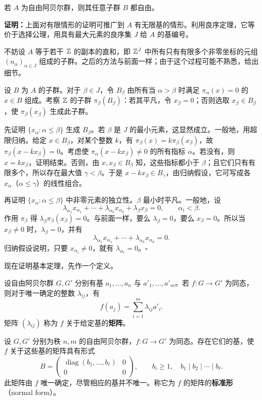 若 $A$ 为自由阿贝尔群，则其任意子群 $B$ 都自由。

\noindent\textbf{证明：}上面对有限情形的证明可推广到 $A$ 有无限基的情形。利用良序定理，它等价于选择公理，用具有最大元素的良序集 $J$ 给 $A$ 的基编号。

不妨设 $A$ 等于若干 $\mathbb{Z}$ 的副本的直和，即 $\mathbb{Z}^J$ 中所有只有有限多个非零坐标的元组 $(n_\alpha)_{\alpha\in J}$ 组成的子群。之后的方法与前面一样；由于这个过程可能不熟悉，给出细节。

设 $B$ 为 $A$ 的子群。对于 $\beta\in J$，令 $B_\beta$ 由所有当 $\alpha>\beta$ 时满足 $\pi_\alpha(x)=0$ 的 $x\in B$ 组成。考察 $\mathbb{Z}$ 的子群 $\pi_\beta(B_\beta)$：若其平凡，令 $x_\beta=0$；否则选取 $x_\beta\in B_\beta$，使 $\pi_\beta(x_\beta)$ 生成此子群。

先证明 $\{x_\alpha:\alpha\leq\beta\}$ 生成 $B_\beta$。若 $\beta$ 是 $J$ 的最小元素，这显然成立。一般地，用超限归纳。给定 $x\in B_\beta$，对某个整数 $k$，有 $\pi_\beta(x)=k\pi_\beta(x_\beta)$，故 $\pi_\beta(x-kx_\beta)=0$。考虑使 $\pi_\alpha(x-kx_\beta)\ne0$ 的所有指标 $\alpha$。若没有，则 $x=kx_\beta$，证明结束。否则，由 $x,x_\beta\in B_\beta$ 知，这些指标都小于 $\beta$；且它们只有有限多个，所以存在最大值 $\gamma<\beta$。于是 $x-kx_\beta\in B_\gamma$，由归纳假设，它可写成各 $x_\alpha$（$\alpha\leq\gamma$）的线性组合。

再证明 $\{x_\alpha:\alpha\leq\beta\}$ 中非零元素的独立性。$\beta$ 最小时平凡。一般地，设
\[
\lambda_{\alpha_1}x_{\alpha_1}+\cdots+\lambda_{\alpha_k}x_{\alpha_k}
+\lambda_\beta x_\beta=0,\qquad \alpha_i<\beta.
\]
作用 $\pi_\beta$ 得 $\lambda_\beta\pi_\beta(x_\beta)=0$。与前面一样，要么 $\lambda_\beta=0$，要么 $x_\beta=0$。所以当 $x_\beta\ne0$ 时，$\lambda_\beta=0$，并有
\[
\lambda_{\alpha_1}x_{\alpha_1}+\cdots+\lambda_{\alpha_k}x_{\alpha_k}=0.
\]
归纳假设说明，只要 $x_{\alpha_i}\ne0$，就有 $\lambda_{\alpha_i}=0$。\hfill$\square$

现在证明基本定理，先作一个定义。

设自由阿贝尔群 $G,G'$ 分别有基 $a_1,\ldots,a_n$ 与 $a'_1,\ldots,a'_m$。若 $f:G\to G'$ 为同态，则对于唯一确定的整数 $\lambda_{ij}$，有
\[
f(a_j)=\sum_{i=1}^m\lambda_{ij}a'_i.
\]
矩阵 $(\lambda_{ij})$ 称为 $f$ 关于给定基的\textbf{矩阵}。

设 $G,G'$ 分别为秩 $n,m$ 的自由阿贝尔群，$f:G\to G'$ 为同态。存在它们的基，使 $f$ 关于这些基的矩阵具有形式
\[
B=\begin{pmatrix}
\operatorname{diag}(b_1,\ldots,b_\ell)&0\\0&0
\end{pmatrix},\qquad b_i\geq1,\quad b_1\mid b_2\mid\cdots\mid b_\ell.
\]
此矩阵由 $f$ 唯一确定，尽管相应的基并不唯一。称它为 $f$ 的矩阵的\textbf{标准形}（normal form）。

